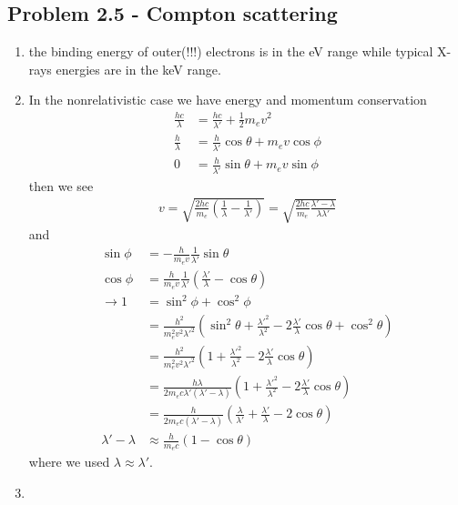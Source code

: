 \documentclass[../main.tex]{subfiles}
\begin{document}
\subsection{Problem 2.5 - Compton scattering}
\begin{enumerate}
    \item the binding energy of outer(!!!) electrons is in the eV range while typical X-rays energies are in the keV range.
    \item In the nonrelativistic case we have energy and momentum conservation
    \begin{align}
        \frac{hc}{\lambda}&=\frac{hc}{\lambda'}+\frac{1}{2}m_ev^2\\
        \frac{h}{\lambda}&=\frac{h}{\lambda'}\cos\theta+m_ev\cos\phi\\
        0&=\frac{h}{\lambda'}\sin\theta+m_ev\sin\phi
    \end{align}
    then we see
    \begin{align}
        v=\sqrt{\frac{2hc}{m_e}\left(\frac{1}{\lambda}-\frac{1}{\lambda'}\right)}
        =\sqrt{\frac{2hc}{m_e}\frac{\lambda'-\lambda}{\lambda\lambda'}}
    \end{align}
    and
    \begin{align}
        \sin\phi&=-\frac{h}{m_ev}\frac{1}{\lambda'}\sin\theta\\
        \cos\phi&=\frac{h}{m_ev}\frac{1}{\lambda'}\left(\frac{\lambda'}{\lambda}-\cos\theta\right)\\
        \rightarrow1&=\sin^2\phi+\cos^2\phi\\
        &=\frac{h^2}{m_e^2v^2\lambda'^2}\left(\sin^2\theta+\frac{\lambda'^2}{\lambda^2}-2\frac{\lambda'}{\lambda}\cos\theta+\cos^2\theta\right)\\
        &=\frac{h^2}{m_e^2v^2\lambda'^2}\left(1+\frac{\lambda'^2}{\lambda^2}-2\frac{\lambda'}{\lambda}\cos\theta\right)\\
        &=\frac{h\lambda}{2m_ec\lambda'(\lambda'-\lambda)}\left(1+\frac{\lambda'^2}{\lambda^2}-2\frac{\lambda'}{\lambda}\cos\theta\right)\\
        &=\frac{h}{2m_ec(\lambda'-\lambda)}\left(\frac{\lambda}{\lambda'}+\frac{\lambda'}{\lambda}-2\cos\theta\right)\\
        \lambda'-\lambda&\approx\frac{h}{m_ec}\left(1-\cos\theta\right)
    \end{align}
    where we used $\lambda\approx\lambda'$.
    \item 
\end{enumerate}
    
\end{document}
